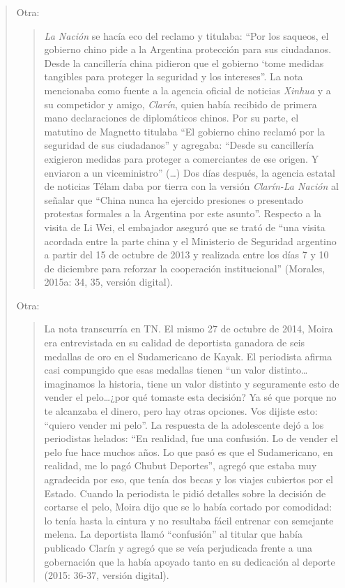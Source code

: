 \begin{quote}
Otra:

\begin{quote}
	\emph{La Nación }se hacía eco del reclamo y titulaba: \enquote{Por los saqueos, el gobierno chino pide a la Argentina protección para sus ciudadanos. Desde la cancillería china pidieron que el gobierno `tome medidas tangibles para proteger la seguridad y los intereses}. La nota mencionaba como fuente a la agencia oficial de noticias \emph{Xinhua} y a su competidor y amigo, \emph{Clarín}, quien había recibido de primera mano declaraciones de diplomáticos chinos. Por su parte, el matutino de Magnetto titulaba \enquote{El gobierno chino reclamó por la seguridad de sus ciudadanos} y agregaba: \enquote{Desde su cancillería exigieron medidas para proteger a comerciantes de ese origen. Y enviaron a un viceministro} (\dots) Dos días después, la agencia estatal de noticias Télam daba por tierra con la versión \emph{Clarín-La Nación }al señalar que \enquote{China nunca ha ejercido presiones o presentado protestas formales a la Argentina por este asunto}. Respecto a la visita de Li Wei, el embajador aseguró que se trató de \enquote{una visita acordada entre la parte china y el Ministerio de Seguridad argentino a partir del 15 de octubre de 2013 y realizada entre los días 7 y 10 de diciembre para reforzar la cooperación institucional} (Morales, 2015a: 34, 35, versión digital).
\end{quote}


Otra:

\begin{quote}
	La nota transcurría en TN. El mismo 27 de octubre de 2014, Moira era entrevistada en su calidad de deportista ganadora de seis medallas de oro en el Sudamericano de Kayak. El periodista afirma casi compungido que esas medallas tienen ``un valor distinto\dots imaginamos la historia, tiene un valor distinto y seguramente esto de vender el pelo\dots ¿por qué tomaste esta decisión? Ya sé que porque no te alcanzaba el dinero, pero hay otras opciones. Vos dijiste esto: \enquote{quiero vender mi pelo}. La respuesta de la adolescente dejó a los periodistas helados: \enquote{En realidad, fue una confusión. Lo de vender el pelo fue hace muchos años. Lo que pasó es que el Sudamericano, en realidad, me lo pagó Chubut Deportes}, agregó que estaba muy agradecida por eso, que tenía dos becas y los viajes cubiertos por el Estado. Cuando la periodista le pidió detalles sobre la decisión de cortarse el pelo, Moira dijo que se lo había cortado por comodidad: lo tenía hasta la cintura y no resultaba fácil entrenar con semejante melena. La deportista llamó \enquote{confusión} al titular que había publicado Clarín y agregó que se veía perjudicada frente a una gobernación que la había apoyado tanto en su dedicación al deporte (2015: 36-37, versión digital).
\end{quote}



\end{quote}
